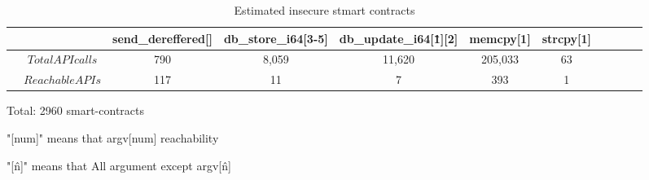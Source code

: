 
\begin{table}[!t]
\caption{Estimated insecure stmart contracts}
\label{escvTable}
\begin{tabular} {ccccccccccc}
\hline\hline
& & send\_dereffered[] & db\_store\_i64[3-5] & db\_update\_i64[\^1][2] & memcpy[1] & strcpy[1] \\
\hline
& $Total API calls$	& 790 	&  	8,059	& 11,620	& 205,033 	& 63	&\\
& $Reachable APIs$	&  117 	&	11		& 7			& 393		& 1		&\\
\hline\hline
\end{tabular}
\begin{tablenotes}
\item Total: 2960 smart-contracts
\item "[num]" means that argv[num] reachability
\item "[\^n]" means that All argument except argv[\^n]
\end{tablenotes}


\end{table}
